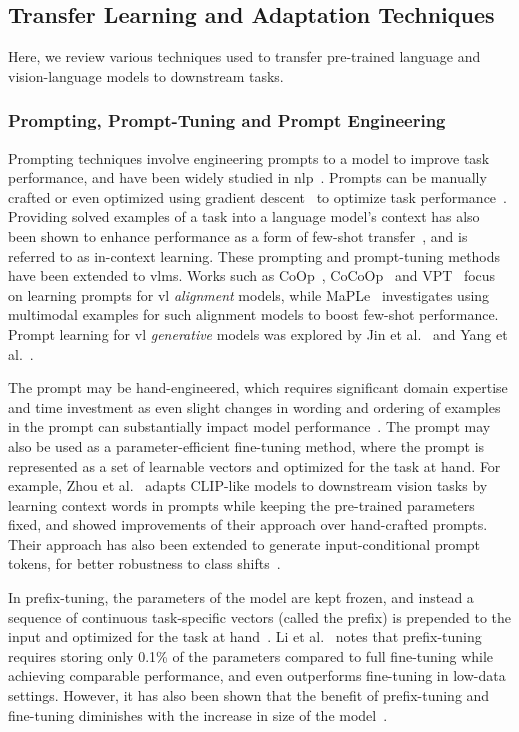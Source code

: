 \documentclass[../ShajiS_RnDReport.tex]{subfiles}
\begin{document}
\subsection{Transfer Learning and Adaptation Techniques}
Here, we review various techniques used to transfer pre-trained language and vision-language models to downstream tasks.

\subsubsection{Prompting, Prompt-Tuning and Prompt Engineering}
Prompting techniques involve engineering prompts to a model to improve task performance, and have been widely studied in \gls{nlp}~\cite{Liu2023}. Prompts can be manually crafted or even optimized using gradient descent~\cite{Li2021} to optimize task performance~\cite{Liu2023,Reynolds2021}. Providing solved examples of a task into a language model's context has also been shown to enhance performance as a form of few-shot transfer~\cite{Brown2020}, and is referred to as in-context learning. These prompting and prompt-tuning methods have been extended to \glspl{vlm}. Works such as CoOp~\cite{Zhou2022}, CoCoOp~\cite{Zhou2022a} and VPT~\cite{Jia2022} focus on learning prompts for \gls{vl} \emph{alignment} models, while MaPLe~\cite{Khattak2023} investigates using multimodal examples for such alignment models to boost few-shot performance. Prompt learning for \gls{vl} \emph{generative} models was explored by Jin et al.~\cite{Jin2022} and Yang et al.~\cite{Yang2023a}.

The prompt may be hand-engineered, which requires significant domain expertise and time investment as even slight changes in wording and ordering of examples in the prompt can substantially impact model performance~\cite{Liu2023}. The prompt may also be used as a parameter-efficient fine-tuning method, where the prompt is represented as a set of learnable vectors and optimized for the task at hand. For example, Zhou et al.~\cite{Zhou2022} adapts CLIP-like models to downstream vision tasks by learning context words in prompts while keeping the pre-trained parameters fixed, and showed improvements of their approach over hand-crafted prompts. Their approach has also been extended to generate input-conditional prompt tokens, for better robustness to class shifts~\cite{Zhou2022a}.

In prefix-tuning, the parameters of the model are kept frozen, and instead a sequence of continuous task-specific vectors (called the prefix) is prepended to the input and optimized for the task at hand~\cite{Li2021}. Li et al.~\cite{Li2021} notes that prefix-tuning requires storing only 0.1\% of the parameters compared to full fine-tuning while achieving comparable performance, and even outperforms fine-tuning in low-data settings. However, it has also been shown that the benefit of prefix-tuning and fine-tuning diminishes with the increase in size of the model~\cite{Raffel2020}.
\end{document}
